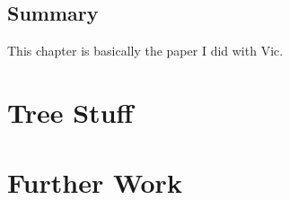 \documentclass[a4paper]{report}
\begin{document}
\section{Summary}
\label{sec:summary-sum-squar}

This chapter is basically the paper I did with Vic.

\chapter{Tree Stuff}
\label{cha:tree-stuff}

\chapter{Further Work}
\label{cha:further-work}





\end{document}
